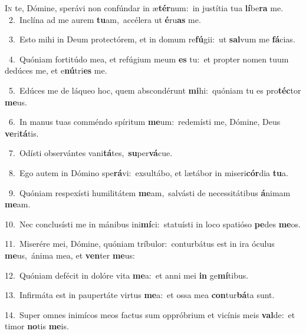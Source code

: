 \lettrine{\initial\textcolor{\initialcolor}{I}}{n} te, Dómine, sperávi non confúndar in æ\-\textbf{tér}\-num:~\star in justítia tua \textbf{lí}\-be\textbf{ra} me.\\
{\numbfont\textcolor{\numbcolor}{~2.}}~Inclína ad me aurem \textbf{tu}\-am,~\star accélera ut \textbf{é}\-ru\textbf{as} me.\par
{\numbfont\textcolor{\numbcolor}{~3.}}~Esto mihi in Deum protectórem, et in domum re\-\textbf{fú}\-gii:~\star ut \textbf{sal}\-vum me \textbf{fá}\-cias.\par
{\numbfont\textcolor{\numbcolor}{~4.}}~Quóniam fortitúdo mea, et refúgium meum \textbf{es} tu:~\star et propter nomen tuum dedúces me, et e\-\textbf{nú}\-tri\textbf{es} me.\par
{\numbfont\textcolor{\numbcolor}{~5.}}~Edúces me de láqueo hoc, quem abscondérunt \textbf{mi}\-hi:~\star quóniam tu es pro\-\textbf{téc}\-tor \textbf{me}\-us.\par
{\numbfont\textcolor{\numbcolor}{~6.}}~In manus tuas comméndo spíritum \textbf{me}\-um:~\star redemísti me, Dómine, Deus \textbf{ve}\-ri\-\textbf{tá}\-tis.\par
{\numbfont\textcolor{\numbcolor}{~7.}}~Odísti observántes vani\-\textbf{tá}\-tes,~\star \textbf{su}\-per\-\textbf{vá}\-cue.\par
{\numbfont\textcolor{\numbcolor}{~8.}}~Ego autem in Dómino spe\-\textbf{rá}\-vi:~\star exsultábo, et lætábor in miseri\-\textbf{cór}\-dia \textbf{tu}\-a.\par
{\numbfont\textcolor{\numbcolor}{~9.}}~Quóniam respexísti humilitátem \textbf{me}\-am,~\star salvásti de necessitátibus \textbf{á}\-nimam \textbf{me}\-am.\par
{\numbfont\textcolor{\numbcolor}{10.}}~Nec conclusísti me in mánibus ini\-\textbf{mí}\-ci:~\star statuísti in loco spatióso \textbf{pe}\-des \textbf{me}\-os.\par
{\numbfont\textcolor{\numbcolor}{11.}}~Miserére mei, Dómine, quóniam tríbulor:~\dagger conturbátus est in ira óculus \textbf{me}\-us,~\star ánima mea, et \textbf{ven}\-ter \textbf{me}\-us:\par
{\numbfont\textcolor{\numbcolor}{12.}}~Quóniam defécit in dolóre vita \textbf{me}\-a:~\star et anni mei \textbf{in} ge\-\textbf{mí}\-tibus.\par
{\numbfont\textcolor{\numbcolor}{13.}}~Infirmáta est in paupertáte virtus \textbf{me}\-a:~\star et ossa mea \textbf{con}\-tur\-\textbf{bá}\-ta sunt.\par
{\numbfont\textcolor{\numbcolor}{14.}}~Super omnes inimícos meos factus sum oppróbrium et vicínis meis \textbf{val}\-de:~\star et timor \textbf{no}\-tis \textbf{me}\-is.\par
